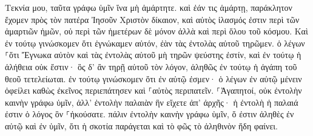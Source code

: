\documentclass{openreader}
\begin{document}
Τεκνία μου, ταῦτα γράφω ὑμῖν ἵνα μὴ ἁμάρτητε. καὶ ἐάν τις ἁμάρτῃ, παράκλητον ἔχομεν πρὸς τὸν πατέρα Ἰησοῦν Χριστὸν δίκαιον, 
καὶ αὐτὸς ἱλασμός ἐστιν περὶ τῶν ἁμαρτιῶν ἡμῶν, οὐ περὶ τῶν ἡμετέρων δὲ μόνον ἀλλὰ καὶ περὶ ὅλου τοῦ κόσμου. 
Καὶ ἐν τούτῳ γινώσκομεν ὅτι ἐγνώκαμεν αὐτόν, ἐὰν τὰς ἐντολὰς αὐτοῦ τηρῶμεν. 
ὁ λέγων ⸀ὅτι Ἔγνωκα αὐτὸν καὶ τὰς ἐντολὰς αὐτοῦ μὴ τηρῶν ψεύστης ἐστίν, καὶ ἐν τούτῳ ἡ ἀλήθεια οὐκ ἔστιν· 
ὃς δ’ ἂν τηρῇ αὐτοῦ τὸν λόγον, ἀληθῶς ἐν τούτῳ ἡ ἀγάπη τοῦ θεοῦ τετελείωται. ἐν τούτῳ γινώσκομεν ὅτι ἐν αὐτῷ ἐσμεν· 
ὁ λέγων ἐν αὐτῷ μένειν ὀφείλει καθὼς ἐκεῖνος περιεπάτησεν καὶ ⸀αὐτὸς περιπατεῖν. 
⸀Ἀγαπητοί, οὐκ ἐντολὴν καινὴν γράφω ὑμῖν, ἀλλ’ ἐντολὴν παλαιὰν ἣν εἴχετε ἀπ’ ἀρχῆς· ἡ ἐντολὴ ἡ παλαιά ἐστιν ὁ λόγος ὃν ⸀ἠκούσατε. 
πάλιν ἐντολὴν καινὴν γράφω ὑμῖν, ὅ ἐστιν ἀληθὲς ἐν αὐτῷ καὶ ἐν ὑμῖν, ὅτι ἡ σκοτία παράγεται καὶ τὸ φῶς τὸ ἀληθινὸν ἤδη φαίνει. 
\end{document}
